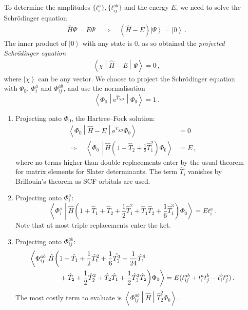 \documentclass{article}
\theoremstyle{plain}\theoremheaderfont{\normalfont\itshape}\theorembodyfont{\rmfamily}\theoremseparator{.}\newtheorem*{rem}{Remark}\newtheorem*{ex}{Example}\newtheorem*{proof}{Proof}\newtheorem*{altp}{Alternative proof}
\theoremstyle{plain}\theoremheaderfont{\normalfont\bfseries}\theorembodyfont{\rmfamily}\theoremseparator{.}\newtheorem{thm}{Theorem}[section]\newtheorem{lem}[thm]{Lemma}\newtheorem{prop}[thm]{Proposition}\newtheorem*{cor}{Corollary}\newtheorem{defn}[thm]{Definition}\newtheorem{clm}[thm]{Claim}\newtheorem{clminproof}{Claim}
\theoremstyle{break}\theoremheaderfont{\normalfont\itshape}\theorembodyfont{\rmfamily}\theoremseparator{.\medskip}\newtheorem*{proofskip}{Proof}\newtheorem*{exs}{Examples}\newtheorem*{rems}{Remarks}
\theoremstyle{break}\theoremheaderfont{\normalfont\bfseries}\theorembodyfont{\rmfamily}\theoremseparator{.\medskip}\newtheorem{lemskip}[thm]{Lemma}\newtheorem{defnskip}[thm]{Definition}\newtheorem{propskip}[thm]{Proposition}\newtheorem{thmskip}[thm]{Theorem}
\numberwithin{equation}{section}
\newcommand{\e}{\mathrm{e}}
\newcommand{\ket}[1]{\left| #1 \right\rangle}
\newcommand{\braket}[2]{\left\langle #1 \middle| #2 \right\rangle}
\newcommand{\mel}[3]{\left\langle #1 \middle| #2 \middle| #3 \right\rangle}
\begin{document}
    To determine the amplitudes \(\{t_{i}^{a}\},\{t_{ij}^{ab}\}\) and the energy \(E\), we need to solve the Schr\"{o}dinger equation
    \begin{eqnarray}
        \hat{H}\Psi=E\Psi\quad\Rightarrow\quad (\hat{H}-E)\ket{\Psi}=\ket{0}\,.
    \end{eqnarray}
    The inner product of \(\ket{0}\) with any state is 0, as so obtained the \textit{projected Schr\"{o}dinger equation}
    \begin{eqnarray}
        \mel{\chi}{\hat{H}-E}{\Psi}=0\,,
    \end{eqnarray}
    where \(\ket{\chi}\) can be any vector. We choose to project the Schr\"{o}dinger equation with \(\Phi_0\), \(\Phi_i^a\) and \(\Phi_{ij}^{ab}\), and use the normalisation
    \begin{equation}
        \mel{\Phi_0}{\e^{\hat{T}_{SD}}}{\Phi_0}=1\,.
    \end{equation}
    \begin{enumerate}[topsep=0pt,label=(\roman*)]
        \item Projecting onto \(\Phi_0\), the Hartree--Fock solution:
        \begin{align}
            \mel{\Phi_0}{\hat{H}-E}{\e^{\hat{T}_{SD}}\Phi_0}&=0\\
            \Rightarrow\quad\braket{\Phi_0}{\hat{H}\left(1+\hat{T}_2+\frac{1}{2}\hat{T}_1^2\right)\Phi_0}&=E\,,
        \end{align}
        where no terms higher than double replacements enter by the usual theorem for matrix elements for Slater determinants. The term \(\hat{T}_i\) vanishes by Brillouin's theorem as SCF orbitals are used.
        \item Projecting onto \(\Phi_i^a\):
        \begin{equation}
            \braket{\Phi_{i}^{a}}{\hat{H}\left(1+\hat{T}_1+\hat{T}_2+\frac{1}{2}\hat{T}_1^2+\hat{T}_1\hat{T}_2+\frac{1}{6}\hat{T}_1^3\right)\Phi_0}=Et_i^a\,.
        \end{equation}
        Note that at most triple replacements enter the ket.
        \item Projecting onto \(\Phi_{ij}^{ab}\):
        \begin{align}
            \bigg\langle\Phi_{ij}^{ab} \bigg| \hat{H}\bigg(&1+\hat{T}_1+\frac{1}{2}\hat{T}_1^2+\frac{1}{6}\hat{T_1^3}+\frac{1}{24}\hat{T}_1^4\notag \\
            &+\hat{T}_2+\frac{1}{2}\hat{T}_2^2+\hat{T}_2\hat{T}_1+\frac{1}{2}\hat{T}_1^2\hat{T}_2\bigg)\Phi_0\bigg\rangle=E(t_{ij}^{ab}+t_{i}^{a}t_{j}^{b}-t_{i}^{b}t_{j}^{a})\,.
        \end{align}
        The most costly term to evaluate is \(\mel{\Phi_{ij}^{ab}}{\hat{H}}{\hat{T}_2^2\Phi_0}\).
    \end{enumerate}
\end{document}
